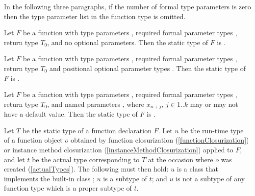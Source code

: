 \documentclass[makeidx]{article}
\begin{document}
\LMHash{}%
In the following three paragraphs,
if the number  of formal type parameters is zero then
the type parameter list in the function type is omitted.

\LMHash{}%
Let $F$ be a function with
type parameters \TypeParametersStd,
required formal parameter types ,
return type $T_0$,
and no optional parameters.
Then the static type of $F$ is
.

\LMHash{}%
Let $F$ be a function with
type parameters \TypeParametersStd,
required formal parameter types ,
return type $T_0$
and positional optional parameter types .
Then the static type of $F$ is
.

\LMHash{}%
Let $F$ be a function with
type parameters \TypeParametersStd,
required formal parameter types ,
return type $T_0$,
and named parameters ,
where $x_{n+j}$, $j \in 1 .. k$ may or may not have a default value.
Then the static type of $F$ is
.

\LMHash{}%
Let $T$ be the static type of a function declaration $F$.
Let $u$ be the run-time type of a function object $o$ obtained by
function closurization
(\ref{functionClosurization})
or instance method closurization
(\ref{instanceMethodClosurization})
applied to $F$,
and let $t$ be the actual type corresponding to $T$
at the occasion where $o$ was created
(\ref{actualTypes}).
The following must then hold:
$u$ is a class that implements the built-in class \FUNCTION;
$u$ is a subtype of $t$;
and $u$ is not a subtype of any function type which is a proper subtype of $t$.

\end{document}
